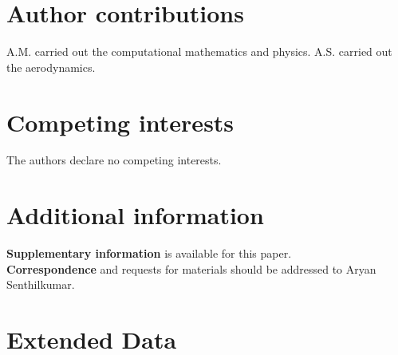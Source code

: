 \documentclass[11pt]{article}
\begin{document}
\section*{Author contributions}
A.M. carried out the computational mathematics and physics. A.S. carried out the aerodynamics.

\section*{Competing interests}
The authors declare no competing interests.

\section*{Additional information}
\textbf{Supplementary information} is available for this paper.\\
\textbf{Correspondence} and requests for materials should be addressed to Aryan Senthilkumar.

\clearpage
\section*{Extended Data}
\end{document}
